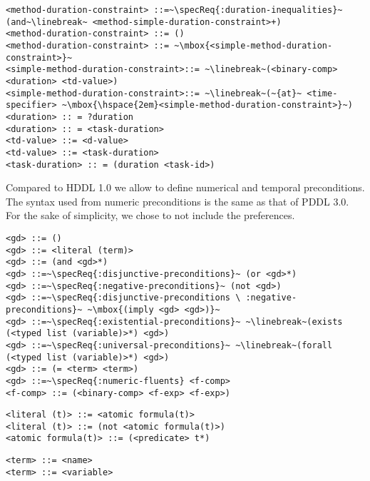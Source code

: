\documentclass[letterpaper]{article} %
\begin{document}
\begin{lstlisting}[firstnumber=last, escapechar=~]
<method-duration-constraint> ::=~\specReq{:duration-inequalities}~ (and~\linebreak~ <method-simple-duration-constraint>+)
<method-duration-constraint> ::= ()
<method-duration-constraint> ::= ~\mbox{<simple-method-duration-constraint>}~
<simple-method-duration-constraint>::= ~\linebreak~(<binary-comp> <duration> <td-value>)
<simple-method-duration-constraint>::= ~\linebreak~(~{at}~ <time-specifier> ~\mbox{\hspace{2em}<simple-method-duration-constraint>}~)
<duration> :: = ?duration
<duration> :: = <task-duration>
<td-value> ::= <d-value>
<td-value> ::= <task-duration>
<task-duration> :: = (duration <task-id>)
\end{lstlisting}

%
%
\noindent Compared to HDDL 1.0 we allow to define numerical and temporal preconditions. The syntax used from numeric preconditions is the same as that of PDDL 3.0. For the sake of simplicity, we chose to not include the preferences.
\begin{lstlisting}[firstnumber=last, escapechar=~]
<gd> ::= ()
<gd> ::= <literal (term)>
<gd> ::= (and <gd>*)
<gd> ::=~\specReq{:disjunctive-preconditions}~ (or <gd>*)
<gd> ::=~\specReq{:negative-preconditions}~ (not <gd>)
<gd> ::=~\specReq{:disjunctive-preconditions \ :negative-preconditions}~ ~\mbox{(imply <gd> <gd>)}~
<gd> ::=~\specReq{:existential-preconditions}~ ~\linebreak~(exists (<typed list (variable)>*) <gd>)
<gd> ::=~\specReq{:universal-preconditions}~ ~\linebreak~(forall (<typed list (variable)>*) <gd>)
<gd> ::= (= <term> <term>)
<gd> ::=~\specReq{:numeric-fluents} <f-comp>
<f-comp> ::= (<binary-comp> <f-exp> <f-exp>)
\end{lstlisting}

\begin{lstlisting}[firstnumber=last, escapechar=~]
<literal (t)> ::= <atomic formula(t)>
<literal (t)> ::= (not <atomic formula(t)>)
<atomic formula(t)> ::= (<predicate> t*)
\end{lstlisting}

\begin{lstlisting}[firstnumber=last, escapechar=~]
<term> ::= <name>
<term> ::= <variable>
\end{lstlisting}
\end{document}
